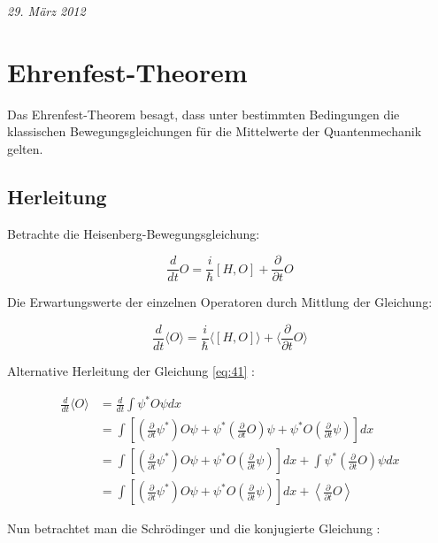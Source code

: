 



\textit{29. März 2012}


\section{Ehrenfest-Theorem}

Das Ehrenfest-Theorem besagt, dass unter bestimmten Bedingungen die klassischen Bewegungsgleichungen für die Mittelwerte der Quantenmechanik gelten.

\subsection{Herleitung}

Betrachte die Heisenberg-Bewegungsgleichung:

\[ \frac{d}{dt} O = \frac{i}{\hbar} [H,O] +\frac{\partial}{\partial t} O \]

Die Erwartungswerte der einzelnen Operatoren durch Mittlung der Gleichung:

\begin{equation} 
\label{eq:41}
\boxed{\frac{d}{dt} \langle O\rangle  = \frac{i}{\hbar} \langle [H,O]\rangle  + \langle  \frac{\partial}{\partial t}  O\rangle } 
\end{equation}

Alternative Herleitung der Gleichung \eqref{eq:41} :

\begin{align}
\frac{d}{dt}\langle  O\rangle  &=  \frac{d}{dt} \int \psi^* O \psi dx \\
&=  \int \left[\left(\frac{\partial}{\partial t} \psi^*\right) O\psi +  \psi^*  \left(\frac{\partial}{\partial t} O\right) \psi + \psi^* O\left(\frac{\partial}{\partial t} \psi\right)\right]dx\\
&=  \int \left[\left(\frac{\partial}{\partial t} \psi^*\right) O\psi  + \psi^* O\left(\frac{\partial}{\partial t} \psi\right)\right]dx + \int  \psi^*  \left(\frac{\partial}{\partial t} O\right) \psi dx \\
&=  \int \left[\left(\frac{\partial}{\partial t} \psi^*\right) O\psi  + \psi^* O\left(\frac{\partial}{\partial t} \psi\right)\right]dx +  \left\langle  \frac{\partial}{\partial t} O\right\rangle \label{eq:40}
\end{align}

Nun betrachtet man die Schrödinger und die konjugierte Gleichung :

